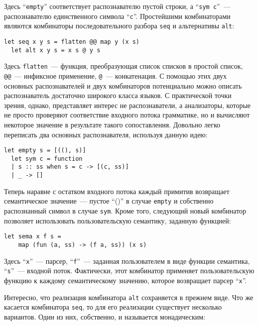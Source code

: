 \documentclass[conference]{IEEEtran}
\begin{document}
Здесь ``\lstinline|empty|'' соответствует распознавателю пустой строки, а ``\lstinline|sym с|''~--- распознавателю единственного символа ``\lstinline|c|''. Простейшими комбинаторами
являются комбинаторы последовательного разбора \lstinline|seq| и альтернативы \lstinline|alt|:

\begin{lstlisting}[basicstyle=\small]
  let seq x y s = flatten @@ map y (x s)
  let alt x y s = x s @ y s
\end{lstlisting}

Здесь \lstinline|flatten|~--- функция, преобразующая список списков в простой список, \lstinline|@@|~--- инфиксное применение, \lstinline|@|~--- конкатенация. С помощью
этих двух основных распознавателей и двух комбинаторов потенциально можно описать распознаватель достаточно широкого класса языков. С практической точки зрения, однако,
представляет интерес не распознаватели, а анализаторы, которые не просто проверяют соответствие входного потока грамматике, но и вычисляют некоторое значение в результате
такого сопоставления. Довольно легко переписать два основных распознавателя, используя данную идею:

\begin{lstlisting}[basicstyle=\small]
  let empty s = [((), s)]
  let sym c = function
  | s :: ss when s = c -> [(c, ss)]
  | _ -> []
\end{lstlisting}

Теперь наравне с остатком входного потока каждый примитив возвращает семантическое значение~--- пустое ``()'' в случае \lstinline|empty| и собственно распознанный
символ в случае \lstinline|sym|. Кроме того, следующий новый комбинатор позволяет использовать пользовательскую семантику, заданную функцией:

\begin{lstlisting}[basicstyle=\small]
  let sema x f s =
    map (fun (a, ss) -> (f a, ss)) (x s)
\end{lstlisting}

Здесь ``\lstinline|x|''~--- парсер, ``\lstinline|f|''~--- заданная пользователем в виде функции семантика, ``\lstinline|s|''~--- входной поток. Фактически, этот комбинатор
применяет пользовательскую функцию к каждому семантическому значению, которое возвращает парсер ``\lstinline|x|''.

Интересно, что реализация комбинатора \lstinline|alt| сохраняется в прежнем виде. Что же касается комбинатора \lstinline|seq|, то для его реализации существует несколько
вариантов. Один из них, собственно, и называется монадическим:
\end{document}
